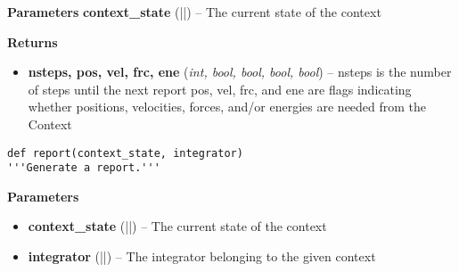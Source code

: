 \begin{description}
\begin{description}
\begin{description}
\item
    \textbf{Parameters}
\textbf{context\_state} (\VERB||) -- The current
state of the context
\item
    \textbf{Returns}
\begin{itemize}
    \item
        \textbf{nsteps, pos, vel, frc, ene} (\emph{int, bool, bool, bool, bool})
    -- nsteps is the number of steps until the next report pos, vel, frc,
    and ene are flags indicating whether positions, velocities, forces,
    and/or energies are needed from the Context
\end{itemize}
\end{description}
\end{description}

\begin{description}
\begin{verbatim}
def report(context_state, integrator)
'''Generate a report.'''
\end{verbatim}

\begin{description}
\item
    \textbf{Parameters}
\begin{itemize}
\item
  \textbf{context\_state} (\VERB||) -- The
  current state of the context
\item
  \textbf{integrator} (\VERB||) -- The
  integrator belonging to the given context
\end{itemize}
\end{description}
\end{description}
\end{description}

